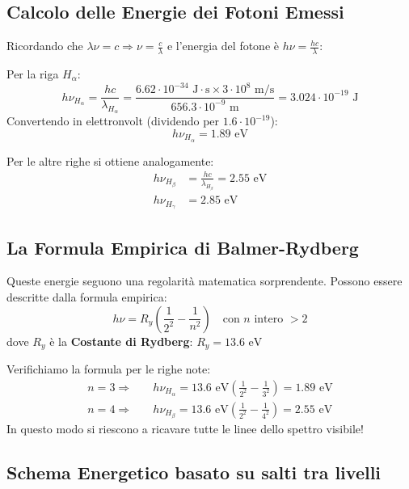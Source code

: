 \documentclass[11pt, a4paper]{article}
\begin{document}
\subsection{Calcolo delle Energie dei Fotoni Emessi} %
Ricordando che $\lambda \nu = c \Rightarrow \nu = \frac{c}{\lambda}$ e l'energia del fotone è $h\nu = \frac{hc}{\lambda}$: %

Per la riga $H_\alpha$: %
\begin{equation*}
    h\nu_{H_\alpha} = \frac{hc}{\lambda_{H_\alpha}} = \frac{6.62 \cdot 10^{-34} \text{ J}\cdot\text{s} \times 3 \cdot 10^8 \text{ m/s}}{656.3 \cdot 10^{-9} \text{ m}} = 3.024 \cdot 10^{-19} \text{ J} %
\end{equation*}
Convertendo in elettronvolt (dividendo per $1.6 \cdot 10^{-19}$): %
\begin{equation}
    h\nu_{H_\alpha} = 1.89 \text{ eV} %
\end{equation}

Per le altre righe si ottiene analogamente: %
\begin{align*}
    h\nu_{H_\beta} &= \frac{hc}{\lambda_{H_\beta}} = 2.55 \text{ eV} \\ %
    h\nu_{H_\gamma} &= 2.85 \text{ eV} %
\end{align*}

\subsection{La Formula Empirica di Balmer-Rydberg} %
Queste energie seguono una regolarità matematica sorprendente. Possono essere descritte dalla formula empirica: %
\begin{equation}
    \boxed{ h\nu = R_y \left( \frac{1}{2^2} - \frac{1}{n^2} \right) } \quad \text{con } n \text{ intero } > 2 %
\end{equation}
dove $R_y$ è la \textbf{Costante di Rydberg}: $R_y = 13.6 \text{ eV}$ %

Verifichiamo la formula per le righe note: %
\begin{align*}
    n=3 \Rightarrow \quad & h\nu_{H_\alpha} = 13.6 \text{ eV} \left( \frac{1}{2^2} - \frac{1}{3^2} \right) = 1.89 \text{ eV} \\ %
    n=4 \Rightarrow \quad & h\nu_{H_\beta} = 13.6 \text{ eV} \left( \frac{1}{2^2} - \frac{1}{4^2} \right) = 2.55 \text{ eV} %
\end{align*}
In questo modo si riescono a ricavare tutte le linee dello spettro visibile! %

\subsection{Schema Energetico basato su salti tra livelli} %
\end{document}
